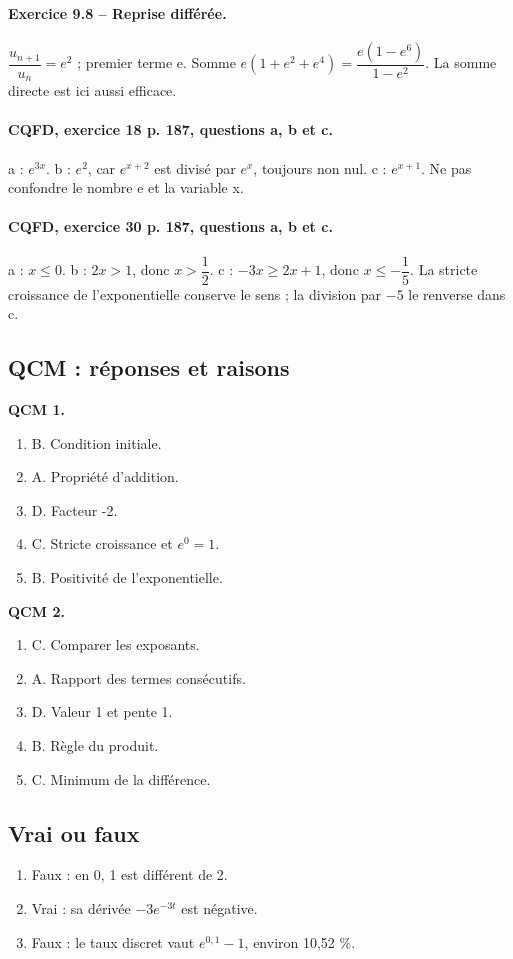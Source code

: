 \paragraph{Exercice 9.8 -- Reprise différée.} $\dfrac{u_{n+1}}{u_n}=e^2$ ; premier terme e. Somme $e(1+e^2+e^4)=\dfrac{e(1-e^6)}{1-e^2}$. La somme directe est ici aussi efficace.
\paragraph{CQFD, exercice 18 p. 187, questions a, b et c.} a : $e^{3x}$. b : $e^2$, car $e^{x+2}$ est divisé par $e^x$, toujours non nul. c : $e^{x+1}$. Ne pas confondre le nombre e et la variable x.
\paragraph{CQFD, exercice 30 p. 187, questions a, b et c.} a : $x\leq0$. b : $2x>1$, donc $x>\dfrac12$. c : $-3x\geq2x+1$, donc $x\leq-\dfrac15$. La stricte croissance de l’exponentielle conserve le sens ; la division par $-5$ le renverse dans c.
\subsection*{QCM : réponses et raisons}
\textbf{QCM 1.}
\begin{enumerate}
\item B. Condition initiale.
\item A. Propriété d’addition.
\item D. Facteur -2.
\item C. Stricte croissance et $e^0=1$.
\item B. Positivité de l’exponentielle.
\end{enumerate}
\textbf{QCM 2.}
\begin{enumerate}
\item C. Comparer les exposants.
\item A. Rapport des termes consécutifs.
\item D. Valeur 1 et pente 1.
\item B. Règle du produit.
\item C. Minimum de la différence.
\end{enumerate}
\subsection*{Vrai ou faux}
\begin{enumerate}
\item Faux : en 0, 1 est différent de 2.
\item Vrai : sa dérivée $-3e^{-3t}$ est négative.
\item Faux : le taux discret vaut $e^{0{,}1}-1$, environ 10,52 \%.
\end{enumerate}

